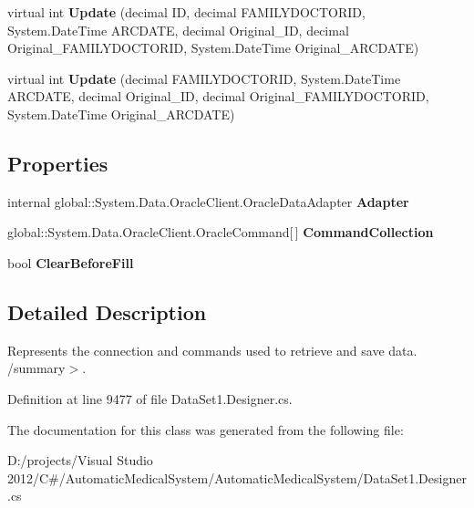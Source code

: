 \begin{CompactItemize}
\item 
virtual int \textbf{Update} (decimal ID, decimal FAMILYDOCTORID, System.DateTime ARCDATE, decimal Original\_\-ID, decimal Original\_\-FAMILYDOCTORID, System.DateTime Original\_\-ARCDATE)\label{class_automatic_medical_system_1_1_data_set1_table_adapters_1_1_a_r_c___f_a_m_i_l_y___d_o_c_t_o_r___r_e_c_o_r_d_s_table_adapter_5eb36741952404d0649b2eefb09ffb19}

\item 
virtual int \textbf{Update} (decimal FAMILYDOCTORID, System.DateTime ARCDATE, decimal Original\_\-ID, decimal Original\_\-FAMILYDOCTORID, System.DateTime Original\_\-ARCDATE)\label{class_automatic_medical_system_1_1_data_set1_table_adapters_1_1_a_r_c___f_a_m_i_l_y___d_o_c_t_o_r___r_e_c_o_r_d_s_table_adapter_0cb84fff21fc5c74d28323dae374faff}

\end{CompactItemize}
\subsection*{Properties}
\begin{CompactItemize}
\item 
internal global::System.Data.OracleClient.OracleDataAdapter \textbf{Adapter}\hspace{0.3cm}{\tt  [get]}\label{class_automatic_medical_system_1_1_data_set1_table_adapters_1_1_a_r_c___f_a_m_i_l_y___d_o_c_t_o_r___r_e_c_o_r_d_s_table_adapter_2dffc72cc1dac522785cccdf4384e202}

\item 
global::System.Data.OracleClient.OracleCommand[$\,$] \textbf{CommandCollection}\hspace{0.3cm}{\tt  [get]}\label{class_automatic_medical_system_1_1_data_set1_table_adapters_1_1_a_r_c___f_a_m_i_l_y___d_o_c_t_o_r___r_e_c_o_r_d_s_table_adapter_e8c1816532fbaa66db171efaeff619f4}

\item 
bool \textbf{ClearBeforeFill}\hspace{0.3cm}{\tt  [get, set]}\label{class_automatic_medical_system_1_1_data_set1_table_adapters_1_1_a_r_c___f_a_m_i_l_y___d_o_c_t_o_r___r_e_c_o_r_d_s_table_adapter_d27623a4bab8ef5e8498ffacf7beb751}

\end{CompactItemize}


\subsection{Detailed Description}
Represents the connection and commands used to retrieve and save data. /summary$>$. 

Definition at line 9477 of file DataSet1.Designer.cs.

The documentation for this class was generated from the following file:\begin{CompactItemize}
\item 
D:/projects/Visual Studio 2012/C\#/AutomaticMedicalSystem/AutomaticMedicalSystem/DataSet1.Designer.cs\end{CompactItemize}

